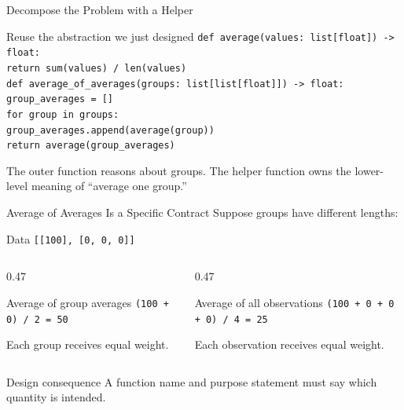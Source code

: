 \documentclass[aspectratio=169,10pt]{beamer}
\begin{document}
\begin{frame}{Decompose the Problem with a Helper}
  \begin{block}{Reuse the abstraction we just designed}
    \texttt{def average(values: list[float]) -> float:}\\
    \hspace*{0.20in}\texttt{return sum(values) / len(values)}\\[0.10in]
    \texttt{def average\_of\_averages(groups: list[list[float]]) -> float:}\\
    \hspace*{0.20in}\texttt{group\_averages = []}\\
    \hspace*{0.20in}\texttt{for group in groups:}\\
    \hspace*{0.40in}\texttt{group\_averages.append(average(group))}\\
    \hspace*{0.20in}\texttt{return average(group\_averages)}
  \end{block}

  \begin{keyidea}
    The outer function reasons about groups. The helper function owns the lower-level meaning of ``average one group.''
  \end{keyidea}
\end{frame}

\begin{frame}{Average of Averages Is a Specific Contract}
  Suppose groups have different lengths:

  \begin{block}{Data}
    \texttt{[[100], [0, 0, 0]]}
  \end{block}

  \begin{columns}[T,onlytextwidth]
    \begin{column}{0.47\textwidth}
      \begin{block}{Average of group averages}
        \centering
        \texttt{(100 + 0) / 2 = 50}
      \end{block}
      Each group receives equal weight.
    \end{column}
    \begin{column}{0.47\textwidth}
      \begin{block}{Average of all observations}
        \centering
        \texttt{(100 + 0 + 0 + 0) / 4 = 25}
      \end{block}
      Each observation receives equal weight.
    \end{column}
  \end{columns}

  \begin{alertblock}{Design consequence}
    A function name and purpose statement must say which quantity is intended.
  \end{alertblock}
\end{frame}
\end{document}
